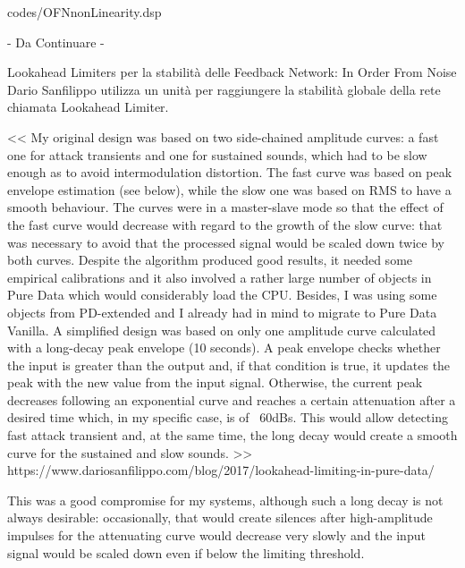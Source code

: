 \vspace{0.5cm} 

{codes/OFNnonLinearity.dsp}

\begin{center} \vspace{0.5cm} \Huge - Da Continuare - \normalsize \vspace{0.5cm} \end{center}

Lookahead Limiters per la stabilità delle Feedback Network:
In Order From Noise Dario Sanfilippo utilizza un unità per raggiungere la stabilità
globale della rete chiamata Lookahead Limiter.

<< My original design was based on two side-chained amplitude curves: 
a fast one for attack transients and one for sustained sounds, which had 
to be slow enough as to avoid intermodulation distortion. The fast curve 
was based on peak envelope estimation (see below), while the slow one was based on 
RMS to have a smooth behaviour. The curves were in a master-slave mode so that 
the effect of the fast curve would decrease with regard to the growth of the slow curve: 
that was necessary to avoid that the processed signal would be scaled down twice by both curves. 
Despite the algorithm produced good results, it needed some empirical calibrations 
and it also involved a rather large number of objects in Pure Data which would considerably load the CPU. 
Besides, I was using some objects from PD-extended and I already had in mind to migrate to Pure Data Vanilla.
A simplified design was based on only one amplitude curve calculated with a long-decay peak envelope (10 seconds). 
A peak envelope checks whether the input is greater than the output and, if that condition is true, 
it updates the peak with the new value from the input signal. 
Otherwise, the current peak decreases following an exponential curve and reaches a certain 
attenuation after a desired time which, in my specific case, is of ~60dBs. 
This would allow detecting fast attack transient and, at the same time, 
the long decay would create a smooth curve for the sustained and slow sounds. >>
https://www.dariosanfilippo.com/blog/2017/lookahead-limiting-in-pure-data/

This was a good compromise for my systems, although such a long decay is not always desirable: occasionally, 
that would create silences after high-amplitude impulses for the attenuating curve 
would decrease very slowly and the input signal would be scaled down even if below the limiting threshold.